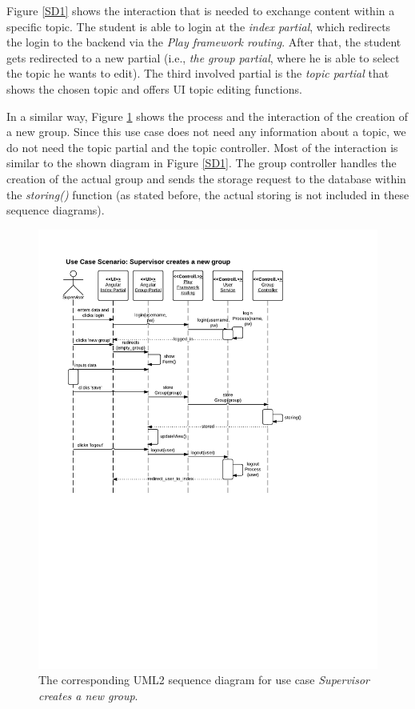 Figure \ref{SD1} shows the interaction that is needed to exchange content within a specific topic. The student is able to login at the \emph{index partial}, which redirects the login to the backend via the \emph{Play framework routing}. After that, the student gets redirected to a new partial (i.e., \emph{the group partial}, where he is able to select the topic he wants to edit). The third involved partial is the \emph{topic partial} that shows the chosen topic and offers \ac{UI} topic editing functions.  

In a similar way, Figure \ref{SD2} shows the process and the interaction of the creation of a new group. Since this use case does not need any information about a topic, we do not need the topic partial and the topic controller. Most of the interaction is similar to the shown diagram in Figure \ref{SD1}. The group controller handles the creation of the actual group and sends the storage request to the database within the \emph{storing()} function (as stated before, the actual storing is not included in these sequence diagrams).

\begin{figure}[th]
\centerline{\includegraphics[width=1\textwidth]{gfx/SDCreateGroup}}
\caption{The corresponding \ac{UML2} sequence diagram for use case \glqq\emph{Supervisor creates a new group}\grqq.}
\label{SD2}
\end{figure} 

